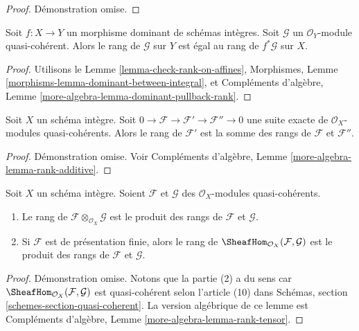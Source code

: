 \begin{proof}
Démonstration omise.
\end{proof}

\begin{lemma}
\label{lemma-dominant-pullback-rank}
Soit  $f : X \to Y$  un morphisme dominant de schémas intègres. Soit  $\mathcal{G}$  un
 $\mathcal{O}_Y$-module quasi-cohérent. Alors le rang de  $\mathcal{G}$  sur  $Y$ 
est égal au rang de  $f^*\mathcal{G}$  sur  $X$.
\end{lemma}

\begin{proof}
Utilisons le Lemme  \ref{lemma-check-rank-on-affines}, Morphismes, Lemme  \ref{morphisms-lemma-dominant-between-integral}, et Compléments
d'algèbre, Lemme  \ref{more-algebra-lemma-dominant-pullback-rank}.
\end{proof}

\begin{lemma}
\label{lemma-rank-additive}
Soit  $X$  un schéma intègre. Soit  $0 \to \mathcal{F} \to \mathcal{F}' \to \mathcal{F}'' \to 0$  une suite exacte de
 $\mathcal{O}_X$-modules quasi-cohérents. Alors le rang de  $\mathcal{F}'$  est la somme
des rangs de  $\mathcal{F}$  et  $\mathcal{F}''$.
\end{lemma}

\begin{proof}
Démonstration omise. Voir Compléments d'algèbre, Lemme  \ref{more-algebra-lemma-rank-additive}.
\end{proof}

\begin{lemma}
\label{lemma-rank-tensor}
Soit  $X$  un schéma intègre. Soient  $\mathcal{F}$  et  $\mathcal{G}$  des
 $\mathcal{O}_X$-modules quasi-cohérents.
\begin{enumerate}
\item Le rang de  $\mathcal{F} \otimes_{\mathcal{O}_X} \mathcal{G}$  est le produit des rangs de  $\mathcal{F}$  et  $\mathcal{G}$.
\item Si  $\mathcal{F}$  est de présentation finie, alors le rang de  $\SheafHom_{\mathcal{O}_X}(\mathcal{F}, \mathcal{G})$  est le
produit des rangs de  $\mathcal{F}$  et  $\mathcal{G}$.
\end{enumerate}
\end{lemma}

\begin{proof}
Démonstration omise. Notons que la partie (2) a du sens car  $\SheafHom_{\mathcal{O}_X}(\mathcal{F}, \mathcal{G})$  est quasi-cohérent selon
l'article (10) dans Schémas, section  \ref{schemes-section-quasi-coherent}. La version algébrique de ce
lemme est Compléments d'algèbre, Lemme  \ref{more-algebra-lemma-rank-tensor}.
\end{proof}


